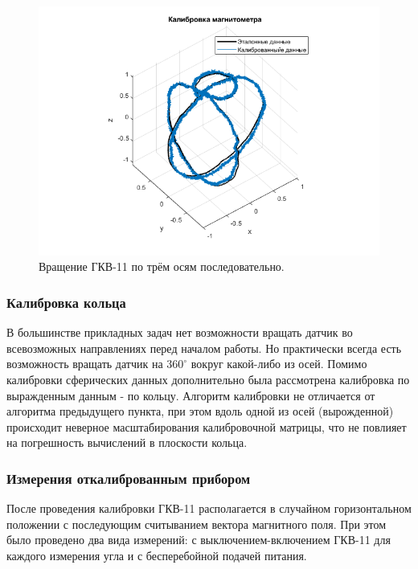 \documentclass[a4paper,12pt]{article}
\begin{document}
\begin{figure}[htb] %
\centering
\includegraphics[width=1\textwidth]{PICS/one_of_experiments.png} %
\caption{\label{fig:one_of_experiments} Вращение ГКВ-11 по трём осям последовательно.} %
\end{figure}

\subsubsection{Калибровка кольца}
В большинстве прикладных задач нет возможности вращать датчик во всевозможных направлениях перед началом работы. Но практически всегда есть возможность вращать датчик на $360^\circ$ вокруг какой-либо из осей. Помимо калибровки сферических данных дополнительно была рассмотрена калибровка по выражденным данным - по кольцу. Алгоритм калибровки не отличается от алгоритма предыдущего пункта, при этом вдоль одной из осей (вырожденной) происходит неверное масштабирования калибровочной матрицы, что не повлияет на погрешность вычислений в плоскости кольца.

\subsubsection{Измерения откалиброванным прибором}
После проведения калибровки ГКВ-11 располагается в случайном горизонтальном положении с последующим  считыванием вектора магнитного поля. При этом было проведено два вида измерений: с выключением-включением ГКВ-11 для каждого измерения угла и с бесперебойной подачей питания.
\end{document}
